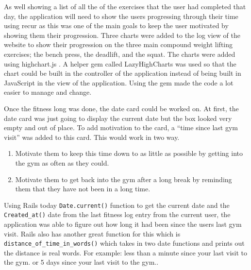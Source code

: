 As well showing a list of all the of the exercises that the user had completed that day, the application will need to show the users progressing through their time using recur as this was one of the main goals to keep the user motivated by showing them their progression. Three charts were added to the log view of the website to show their progression on the three main compound weight lifting exercises; the bench press, the deadlift, and the squat. The charts were added using highchart.js \citep{highcharts:2009}. A helper gem called LazyHighCharts \citep{lhc:2010} was used so that the chart could be built in the controller of the application instead of being built in JavaScript in the view of the application. Using the gem made the code a lot easier to manage and change.

Once the fitness long was done, the date card could be worked on. At first, the date card was just going to display the current date but the box looked very empty and out of place. To add motivation to the card, a ``time since last gym visit'' was added to this card. This would work in two way.

\begin{enumerate}
\item Motivate them to keep this time down to as little as possible by getting into the gym as often as they could.
\item Motivate them to get back into the gym after a long break by reminding them that they have not been in a long time.
\end{enumerate}

Using Rails today \lstinline{Date.current()} function to get the current date and the \lstinline{Created_at()} date from the last fitness log entry from the current user, the application was able to figure out how long it had been since the users last gym visit. Rails also has another great function for this which is \lstinline{distance_of_time_in_words()} which takes in two date functions and prints out the distance is real words. For example: less than a minute since your last visit to the gym. or 5 days since your last visit to the gym..\\

